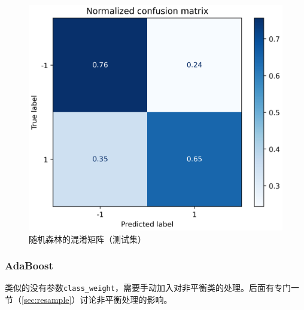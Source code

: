 \documentclass[a4paper]{article}
\begin{document}
\begin{figure}[!h]
    \centering
    \includegraphics[width=0.48\linewidth]{RandomForest_confus_mat-norm.png}
    \caption{随机森林的混淆矩阵（测试集）}
    \label{fig:result:rfc}
\end{figure}

\subsubsection{AdaBoost}
类似的没有参数\texttt{class\_weight}，需要手动加入对非平衡类的处理。后面有专门一节（\ref{sec:resample}）讨论非平衡处理的影响。
\end{document}
